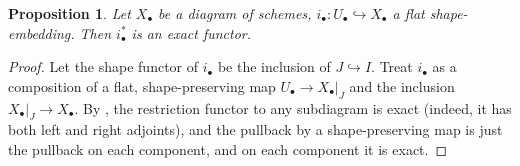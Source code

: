 \documentclass[proquest]{uwthesis}[2014/11/13]
\newtheorem{prop}[theorem]{Proposition}
\theoremstyle{definition}
\begin{document}
\begin{prop}
	Let $X_\bullet$ be a diagram of schemes, $i_\bullet : U_\bullet \hookrightarrow X_\bullet$ a flat shape-embedding.
	Then $i_\bullet^*$ is an exact functor.
\end{prop}
\begin{proof}
	Let the shape functor of $i_\bullet$ be the inclusion of $J \hookrightarrow I$.
	Treat $i_\bullet$ as a composition of a flat, shape-preserving map $U_\bullet \rightarrow X_\bullet|_J$ and the inclusion $X_\bullet|_J \rightarrow X_\bullet$.
	By \cite[II 6]{Lipman2009}, the restriction functor to any subdiagram is exact (indeed, it has both left and right adjoints), and the pullback by a shape-preserving map is just the pullback on each component, and on each component it is exact.
\end{proof}
\end{document}

